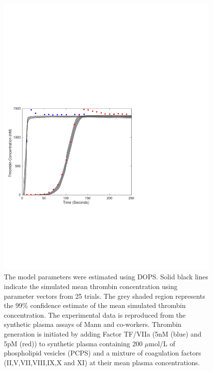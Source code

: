 \documentclass{bmcart}
\begin{document}
\begin{backmatter}
\begin{figure}[h!]
\centering
\includegraphics[trim = {0cm 6cm 7cm 6cm }, clip,width=1.0\textwidth]{./rachelfigs/ReplicateFigure5DivBySqrtN.pdf}
\caption{ The model parameters were estimated using DOPS. Solid black lines indicate the simulated mean thrombin concentration using parameter vectors from 25 trials. The grey shaded region represents the 99\% confidence estimate of the mean simulated thrombin concentration. The experimental data is reproduced from the synthetic plasma assays of Mann and co-workers. Thrombin generation is initiated by adding Factor TF/VIIa (5nM (blue) and 5pM (red)) to synthetic plasma containing 200 $\mu$mol/L of phospholipid vesicles (PCPS) and a mixture of coagulation factors (II,V,VII,VIII,IX,X and XI) at their mean plasma concentrations.
}\label{fig-train}
\end{figure}

\clearpage


\end{backmatter}
\end{document}
